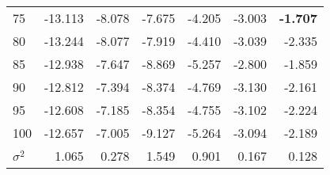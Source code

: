 \documentclass[letterpaper,12pt]{article}
\begin{document}
\begin{table}
\begin{center}
\begin{tabular}{| l | rr | rr | rr |}
				75  & -13.113 & -8.078 &      -7.675 & -4.205 &  -3.003 & \textbf{-1.707} \\
				80  & -13.244 & -8.077 &      -7.919 & -4.410 &  -3.039 & -2.335 \\
				85  & -12.938 & -7.647 &      -8.869 & -5.257 &  -2.800 & -1.859 \\
				90  & -12.812 & -7.394 &      -8.374 & -4.769 &  -3.130 & -2.161 \\
				95  & -12.608 & -7.185 &      -8.354 & -4.755 &  -3.102 & -2.224 \\
				100 & -12.657 & -7.005 &      -9.127 & -5.264 &  -3.094 & -2.189 \\
			\hline
			$\sigma^2$ & 1.065 & 0.278 & 1.549 & 0.901 & 0.167 & 0.128 \\
			\hline
			\end{tabular}
	\end{center}
\end{table}
\newpage
\end{document}
